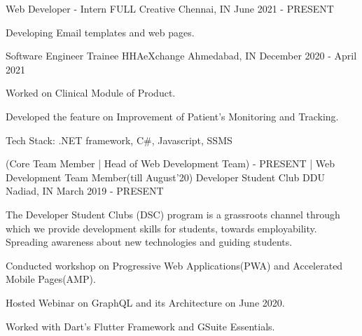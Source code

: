 
\begin{cventries}
  \cventry
    {Web Developer - Intern} %
    {FULL Creative} %
    {Chennai, IN} %
    {June 2021 - PRESENT} %
    {
      \begin{cvitems} %
      \item {Developing Email templates and web pages.}
      \end{cvitems}
    }
    
  \cventry
    {Software Engineer Trainee} %
    {HHAeXchange} %
    {Ahmedabad, IN} %
    {December 2020 - April 2021} %
    {
      \begin{cvitems} %
        \item {Worked on Clinical Module of Product.}
        \item {Developed the feature on Improvement of Patient's Monitoring and Tracking.}
        \item {Tech Stack: .NET framework, C\#, Javascript, SSMS}
      \end{cvitems}
    }
  \cventry
    {(Core Team Member | Head of Web Development Team) - PRESENT | Web Development Team Member(till August'20)} %
    {Developer Student Club DDU} %
    {Nadiad, IN} %
    {March 2019 - PRESENT} %
    {
      \begin{cvitems} %
        \item {The Developer Student Clubs (DSC) program is a grassroots channel through which we provide development skills for students, towards employability. Spreading awareness about new technologies and guiding students.}
        \item{Conducted workshop on Progressive Web Applications(PWA) and Accelerated Mobile Pages(AMP).}
        \item{Hosted Webinar on GraphQL and its Architecture on June 2020.}
        \item{Worked with Dart's Flutter Framework and GSuite Essentials.}
      \end{cvitems}
    }

    
\end{cventries}
